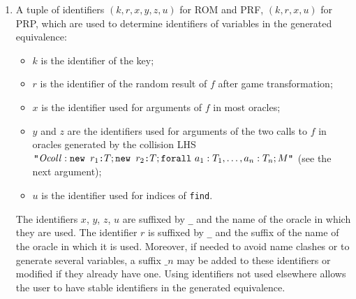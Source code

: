 \begin{itemize}
\begin{enumerate}
\item A tuple of identifiers $(k, r, x, y, z, u)$ for ROM and PRF,
$(k, r, x, u)$ for PRP, which are used to
determine identifiers of variables in the generated equivalence:
\begin{itemize}
\item $k$ is the identifier of the key;
\item $r$ is the identifier of the random result of $f$ after game transformation;
\item $x$ is the identifier used for arguments of $f$ in most oracles;
\item $y$ and $z$ are the identifiers used for arguments of the two calls to $f$
in oracles generated by the collision LHS
$\texttt{"}\mathit{Ocoll}: \texttt{new\ }{r_1}\texttt{:}{T}; \texttt{new\ }{r_2}\texttt{:}{T}; \texttt{forall}\ a_1:T_1, \dots, a_n:T_n; M\texttt{"}$
(see the next argument);
\item $u$ is the identifier used for indices of {\tt find}.
\end{itemize}
The identifiers $x$, $y$, $z$, $u$ are suffixed by \texttt{\_} and the name of the oracle
in which they are used. The identifier $r$ is suffixed by \texttt{\_} and the suffix of
the name of the oracle in which it is used.
Moreover, if needed to avoid name clashes or to generate several variables,
a suffix $\_n$ may be added to these identifiers or modified if they
already have one. Using identifiers not used elsewhere allows
the user to have stable identifiers in the generated equivalence.


\end{enumerate}
\end{itemize}
